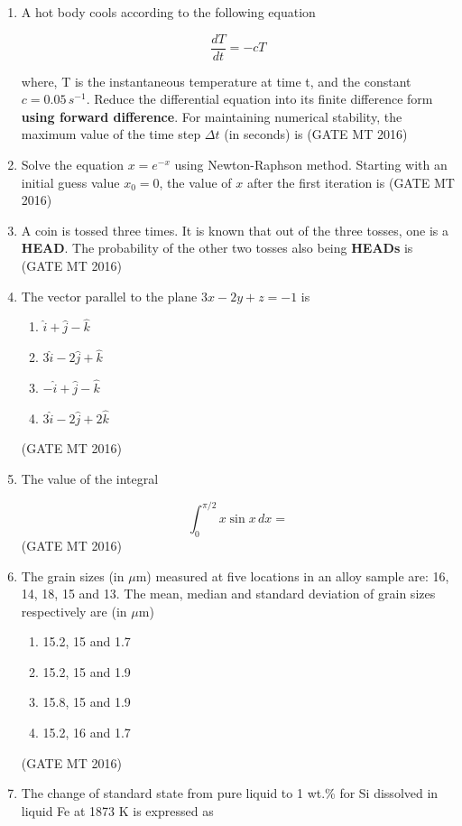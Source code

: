 \documentclass[11pt, letterpaper]{article}
\theoremstyle{remark}
\begin{document}
\begin{enumerate}
\item A hot body cools according to the following equation

$$\frac{dT}{dt} = -cT$$

where, T is the instantaneous temperature at time t, and the constant $c = 0.05 \, s^{-1}$. Reduce the differential equation into its finite difference form \textbf{using forward difference}. For maintaining numerical stability, the maximum value of the time step $\Delta t$ (in seconds) is 
\hfill(GATE MT 2016)

\item Solve the equation $x = e^{-x}$ using Newton-Raphson method. Starting with an initial guess value $x_0 = 0$, the value of $x$ after the first iteration is 
\hfill(GATE MT 2016)

\item A coin is tossed three times. It is known that out of the three tosses, one is a \textbf{HEAD}. The probability of the other two tosses also being \textbf{HEADs} is 
\hfill(GATE MT 2016)

\item The vector parallel to the plane $3x - 2y + z = -1$ is
\begin{enumerate}
\item $\hat{i} + \hat{j} - \hat{k}$
\item $3\hat{i} - 2\hat{j} + \hat{k}$
\item $-\hat{i} + \hat{j} - \hat{k}$
\item $3\hat{i} - 2\hat{j} + 2\hat{k}$
\end{enumerate}
\hfill(GATE MT 2016)

\item The value of the integral

$$\int_{0}^{\pi/2} x \sin x \, dx =$$ 
\hfill(GATE MT 2016)

\item The grain sizes (in $\mu$m) measured at five locations in an alloy sample are: 16, 14, 18, 15 and 13. The mean, median and standard deviation of grain sizes respectively are (in $\mu$m)
\begin{enumerate}
\item 15.2, 15 and 1.7
\item 15.2, 15 and 1.9
\item 15.8, 15 and 1.9
\item 15.2, 16 and 1.7
\end{enumerate}
\hfill(GATE MT 2016)

\item The change of standard state from pure liquid to 1 wt.\% for Si dissolved in liquid Fe at 1873 K is expressed as


\end{enumerate}
\end{document}
